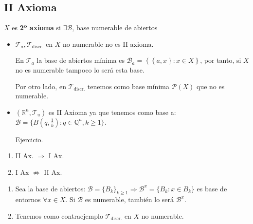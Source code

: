 \subsection{II Axioma}%
\label{sub:iiax}
\begin{defi}[II Ax.]
$X$ es \textbf{2º axioma} si $\exists \mathcal{B}$, base numerable de abiertos
\end{defi}

\begin{ej}
\begin{itemize}
    \item $\mathcal{T}_a, \mathcal{T}_{\text{discr.}}$ en $X$ no numerable no es II axioma.
    \begin{demo}
        En $\mathcal{T}_a$ la base de abiertos mínima es $\mathcal{B}_a = \left\{ \left\{ a, x \right\}: x \in X \right\}$, por tanto, si $X$ no es numerable
        tampoco lo será esta base.

        Por otro lado, en $\mathcal{T}_{\text{discr.}}$ tenemos como base mínima $\mathcal{P}\left( X \right)$ que no es numerable.
    \end{demo}
    \item $\left( \mathbb{R}^n, \mathcal{T}_{u} \right)$ es II Axioma ya que tenemos como base a: $\mathcal{B} = \{B \left( q, \frac{1}{k}\right) : q \in \mathbb{Q}^n, k \ge 1 \}$.
    \begin{demo}
        Ejercicio.
    \end{demo}
\end{itemize}
\end{ej}

\begin{prop}
\begin{enumerate}
    \item II Ax. $\Rightarrow$ I Ax. 
    \item I Ax $\not \Rightarrow$ II Ax. 
\end{enumerate}
\end{prop}
\begin{demo}
\begin{enumerate}
    \item Sea la base de abiertos: $\mathcal{B} = \{B_k\}_{k \ge 1} \Rightarrow \mathcal{B}^x = \{B_k : x \in B_k\}$ es base de entornos $\forall x \in X$. Si $\mathcal{B}$ es numerable, también lo será $\mathcal{B}^x$.
    \item Tenemos como contraejemplo $\mathcal{T}_{\text{discr.}}$ en $X$ no numerable.
\end{enumerate}
\end{demo}

